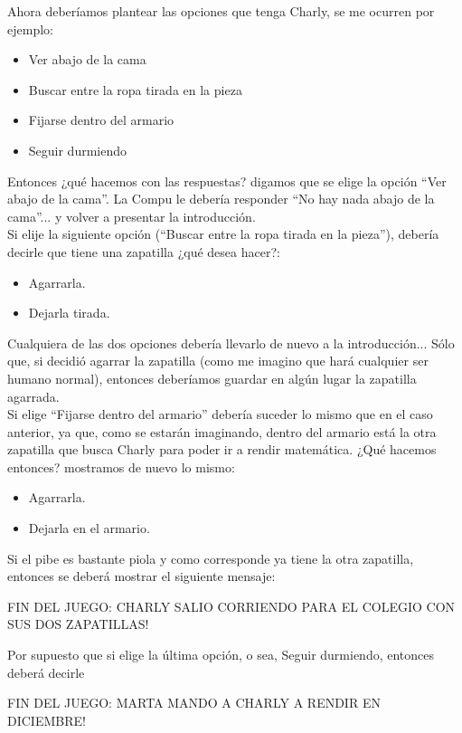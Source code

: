 Ahora deberíamos plantear las opciones que tenga Charly, se me ocurren por ejemplo:
\begin{itemize}
  \item Ver abajo de la cama
  \item Buscar entre la ropa tirada en la pieza
  \item Fijarse dentro del armario
  \item Seguir durmiendo
\end{itemize}

Entonces ¿qué hacemos con las respuestas? digamos que se elige la opción “Ver abajo de la cama”. La Compu le debería responder “No hay nada abajo de la cama”... y volver a presentar la introducción.\\

Si elije la siguiente opción (“Buscar entre la ropa tirada en la pieza”), debería decirle que tiene una zapatilla ¿qué desea hacer?:
\begin{itemize}
  \item Agarrarla.
  \item Dejarla tirada.
\end{itemize}

Cualquiera de las dos opciones debería llevarlo de nuevo a la introducción... Sólo que, si decidió agarrar la zapatilla (como me imagino que hará cualquier ser humano normal), entonces deberíamos guardar en algún lugar la zapatilla agarrada.\\

Si elige “Fijarse dentro del armario” debería suceder lo mismo que en el caso anterior, ya que, como se estarán imaginando, dentro del armario está la otra zapatilla que busca Charly para poder ir a rendir matemática. ¿Qué hacemos entonces? mostramos de nuevo lo mismo:
\begin{itemize}
  \item Agarrarla.
  \item Dejarla en el armario.
\end{itemize}

Si el pibe es bastante piola y como corresponde ya tiene la otra zapatilla, entonces se deberá mostrar el siguiente mensaje:
\begin{console-output}
FIN DEL JUEGO: CHARLY SALIO CORRIENDO PARA EL COLEGIO CON SUS DOS ZAPATILLAS!
\end{console-output}

Por supuesto que si elige la última opción, o sea,  Seguir durmiendo, entonces deberá decirle
\begin{console-output}
FIN DEL JUEGO: MARTA MANDO A CHARLY A RENDIR EN DICIEMBRE!
\end{console-output}